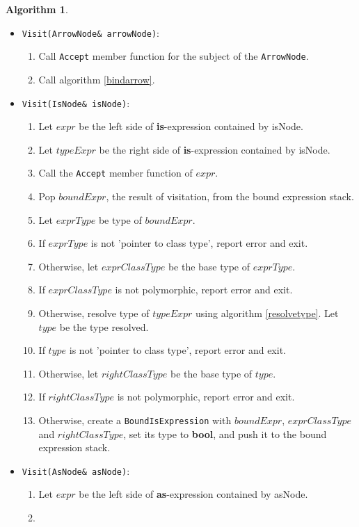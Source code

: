 \documentclass[a4paper,oneside,11pt]{book}
\theoremstyle{definition}
\newtheorem{algo}{Algorithm}[section]
\begin{document}
\begin{algo}
\begin{itemize}
Call algorithm \ref{bindindex}.
\item
\verb|Visit(ArrowNode& arrowNode)|:\\
\begin{enumerate}
\item
Call \verb|Accept| member function for the subject of the \verb|ArrowNode|.
\item
Call algorithm \ref{bindarrow}.
\end{enumerate}
\item
\verb|Visit(IsNode& isNode)|:\\
\begin{enumerate}
\item
Let $expr$ be the left side of \textbf{is}-expression contained by isNode.
\item
Let $typeExpr$ be the right side of \textbf{is}-expression contained by isNode.
\item
Call the \verb|Accept| member function of $expr$.
\item
Pop $boundExpr$, the result of visitation, from the bound expression stack.
\item
Let $exprType$ be type of $boundExpr$.
\item
If $exprType$ is not 'pointer to class type', report error and exit.
\item
Otherwise, let $exprClassType$ be the base type of $exprType$.
\item
If $exprClassType$ is not polymorphic, report error and exit.
\item
Otherwise, resolve type of $typeExpr$ using algorithm \ref{resolvetype}. Let $type$ be the type resolved.
\item
If $type$ is not 'pointer to class type', report error and exit.
\item
Otherwise, let $rightClassType$ be the base type of $type$.
\item
If $rightClassType$ is not polymorphic, report error and exit.
\item
Otherwise, create a \verb|BoundIsExpression| with $boundExpr$, $exprClassType$ and $rightClassType$, set its type to \textbf{bool},
and push it to the bound expression stack.
\end{enumerate}
\item
\verb|Visit(AsNode& asNode)|:\\
\begin{enumerate}
\item
Let $expr$ be the left side of \textbf{as}-expression contained by asNode.
\item

\end{enumerate}
\end{itemize}
\end{algo}
\end{document}
